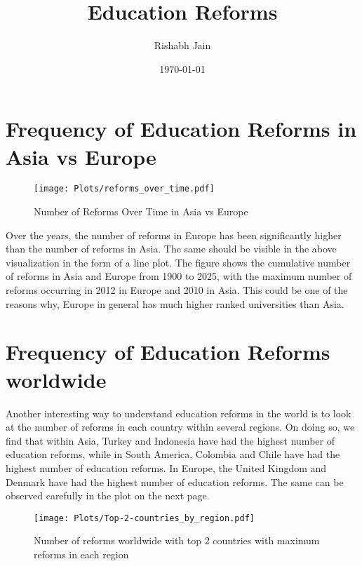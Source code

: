 \documentclass{article}
\begin{document}
\title{Education Reforms}
\author{Rishabh Jain}
\date{\today}
\maketitle


\section{Frequency of Education Reforms in Asia vs Europe}
\begin{figure}[h]
\centering
\texttt{[image: Plots/reforms\_over\_time.pdf]}
\caption{Number of Reforms Over Time in Asia vs Europe}
\label{fig:reforms}
\end{figure}
Over the years, the number of reforms in Europe has been significantly higher than the number of reforms in Asia.
The same should be visible in the above visualization in the form of a line plot.
The figure shows the cumulative number of reforms in Asia and Europe from 1900 to 2025, with the maximum number of reforms occurring in 2012 in Europe and 2010 in Asia.
This could be one of the reasons why, Europe in general has much higher ranked universities than Asia.


\section{Frequency of Education Reforms worldwide}
Another interesting way to understand education reforms in the world is to look at the number of reforms in each country within several regions. On doing so, we find that within Asia, Turkey and Indonesia have had the highest number of education reforms, while in South America, Colombia and Chile have had the highest number of education reforms. In Europe, the United Kingdom and Denmark have had the highest number of education reforms.
The same can be observed carefully in the plot on the next page.
\begin{figure}[h]
\centering
\texttt{[image: Plots/Top-2-countries\_by\_region.pdf]}
\caption{Number of reforms worldwide with top 2 countries with maximum reforms in each region}
\label{fig:top_countries}
\end{figure}
\end{document}
